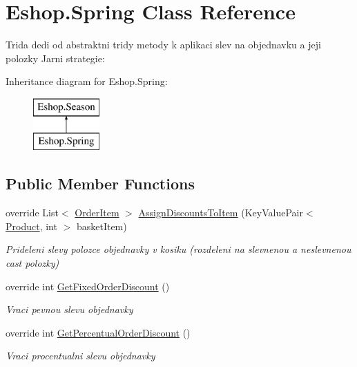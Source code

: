 \hypertarget{class_eshop_1_1_spring}{}\section{Eshop.\+Spring Class Reference}
\label{class_eshop_1_1_spring}


Trida dedi od abstraktni tridy metody k aplikaci slev na objednavku a jeji polozky Jarni strategie\+:  


Inheritance diagram for Eshop.\+Spring\+:\begin{figure}[H]
\begin{center}
\leavevmode
\includegraphics[height=2.000000cm]{class_eshop_1_1_spring}
\end{center}
\end{figure}
\subsection*{Public Member Functions}
\begin{DoxyCompactItemize}
\item 
override List$<$ \mbox{\hyperlink{class_eshop_1_1_order_item}{Order\+Item}} $>$ \mbox{\hyperlink{class_eshop_1_1_spring_a153afff8b69d351f44248def96bfff7c}{Assign\+Discounts\+To\+Item}} (Key\+Value\+Pair$<$ \mbox{\hyperlink{class_eshop_1_1_product}{Product}}, int $>$ basket\+Item)
\begin{DoxyCompactList}\small\item\em Prideleni slevy polozce objednavky v kosiku (rozdeleni na slevnenou a neslevnenou cast polozky) \end{DoxyCompactList}\item 
override int \mbox{\hyperlink{class_eshop_1_1_spring_aa3dfae255c5d19147350cd78fa140f55}{Get\+Fixed\+Order\+Discount}} ()
\begin{DoxyCompactList}\small\item\em Vraci pevnou slevu objednavky \end{DoxyCompactList}\item 
override int \mbox{\hyperlink{class_eshop_1_1_spring_a1c4c4c98856a009b527eb0c74af83297}{Get\+Percentual\+Order\+Discount}} ()
\begin{DoxyCompactList}\small\item\em Vraci procentualni slevu objednavky \end{DoxyCompactList}\end{DoxyCompactItemize}
